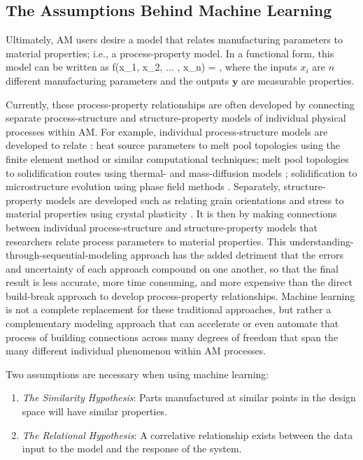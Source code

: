 \subsection{The Assumptions Behind Machine Learning}
Ultimately, AM users desire a model that relates manufacturing parameters to material properties; i.e., a process-property model. In a functional form, this model can be written as
\eqn
f(x_1, x_2, ... , x_n) = ,
\label{fundamentalgoal}
\equ
where the inputs $x_i$ are $n$ different manufacturing parameters and the outputs $\mathbf{y}$ are measurable properties.

Currently, these process-property relationships are often developed by connecting separate process-structure and structure-property models of individual physical processes within AM.
For example, individual process-structure models are developed to relate : heat source parameters to melt pool topologies \cite{Khairallah2016} using the finite element method or similar computational techniques; melt pool topologies to solidification routes using thermal- and mass-diffusion models  \cite{Tan2011}; solidification to microstructure evolution using phase field methods \cite{Kundin2015}.
Separately, structure-property models are developed such as relating grain orientations and stress to material properties using crystal plasticity \cite{Pal2014}.
It is then by making connections between individual process-structure and structure-property models that researchers relate process parameters to material properties.
This understanding-through-sequential-modeling approach has the added detriment that the errors and uncertainty of each approach compound on one another, so that the final result is less accurate, more time consuming, and more expensive than the direct build-break approach to develop process-property relationships.
Machine learning is not a complete replacement for these traditional approaches, but rather a complementary modeling approach that can accelerate or even automate that process of building connections across many degrees of freedom that span the many different individual phenomenon within AM processes.

Two assumptions are necessary when using machine learning:
\begin{enumerate}
\item \textit{The Similarity Hypothesis}: Parts manufactured at similar points in the design space will have similar properties.
\item \textit{The Relational Hypothesis}: A correlative relationship exists between the data input to the model and the response of the system.
\end{enumerate}

